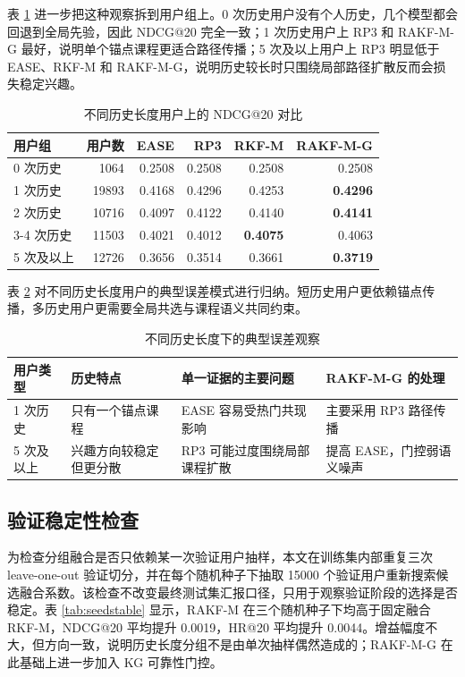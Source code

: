 \documentclass[10pt,twoside,twocolumn]{article}
\begin{document}
表 \ref{tab:segcompare} 进一步把这种观察拆到用户组上。0 次历史用户没有个人历史，几个模型都会回退到全局先验，因此 NDCG@20 完全一致；1 次历史用户上 RP3 和 RAKF-M-G 最好，说明单个锚点课程更适合路径传播；5 次及以上用户上 RP3 明显低于 EASE、RKF-M 和 RAKF-M-G，说明历史较长时只围绕局部路径扩散反而会损失稳定兴趣。

\begin{table}[t]
  \centering
  \caption{不同历史长度用户上的 NDCG@20 对比}
  \label{tab:segcompare}
  \begin{tabular}{lrrrrr}
    \toprule
    用户组 & 用户数 & EASE & RP3 & RKF-M & RAKF-M-G \\
    \midrule
    0 次历史 & 1064 & 0.2508 & 0.2508 & 0.2508 & 0.2508 \\
    1 次历史 & 19893 & 0.4168 & 0.4296 & 0.4253 & \textbf{0.4296} \\
    2 次历史 & 10716 & 0.4097 & 0.4122 & 0.4140 & \textbf{0.4141} \\
    3-4 次历史 & 11503 & 0.4021 & 0.4012 & \textbf{0.4075} & 0.4063 \\
    5 次及以上 & 12726 & 0.3656 & 0.3514 & 0.3661 & \textbf{0.3719} \\
    \bottomrule
  \end{tabular}
\end{table}

表 \ref{tab:cases} 对不同历史长度用户的典型误差模式进行归纳。短历史用户更依赖锚点传播，多历史用户更需要全局共选与课程语义共同约束。

\begin{table}[t]
  \centering
  \caption{不同历史长度下的典型误差观察}
  \label{tab:cases}
  \begin{tabular}{llll}
    \toprule
    用户类型 & 历史特点 & 单一证据的主要问题 & RAKF-M-G 的处理 \\
    \midrule
    1 次历史 & 只有一个锚点课程 & EASE 容易受热门共现影响 & 主要采用 RP3 路径传播 \\
    5 次及以上 & 兴趣方向较稳定但更分散 & RP3 可能过度围绕局部课程扩散 & 提高 EASE，门控弱语义噪声 \\
    \bottomrule
  \end{tabular}
\end{table}

\subsection{验证稳定性检查}
为检查分组融合是否只依赖某一次验证用户抽样，本文在训练集内部重复三次 leave-one-out 验证切分，并在每个随机种子下抽取 15000 个验证用户重新搜索候选融合系数。该检查不改变最终测试集汇报口径，只用于观察验证阶段的选择是否稳定。表 \ref{tab:seedstable} 显示，RAKF-M 在三个随机种子下均高于固定融合 RKF-M，NDCG@20 平均提升 0.0019，HR@20 平均提升 0.0044。增益幅度不大，但方向一致，说明历史长度分组不是由单次抽样偶然造成的；RAKF-M-G 在此基础上进一步加入 KG 可靠性门控。
\end{document}
